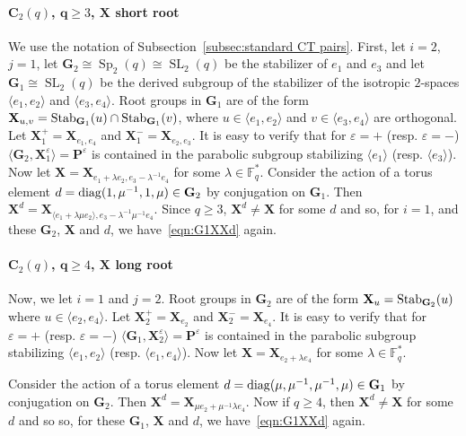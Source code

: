\documentclass[12pt]{amsart}
\theoremstyle{definition}
\newcommand{\diag}{\mathop{\rm diag}\nolimits}
\DeclareMathOperator{\SL}{SL}
\newcommand{\FF}{{\mathbb F}}
\DeclareMathOperator{\Sp}{Sp}
\newcommand{\Stab}{\mathop{\rm Stab}}
\newcommand{\vep}{\varepsilon}
\newcommand{\amgrpG}{{\mathbf{G}}}
\newcommand{\amgrpP}{{\mathbf{P}}}
\newcommand{\amgrpX}{{\mathbf{X}}}
\begin{document}
\paragraph{\bf ${\mathbf C_2(q)}$, ${\mathbf q\ge 3}$, $\mathbf \amgrpX$ short root}
We use  the notation of Subsection~\ref{subsec:standard CT pairs}.
First, let $i=2$, $j=1$, let $\amgrpG_2\cong \Sp_2(q)\cong\SL_2(q)$ be the stabilizer of $e_1$ and $e_3$ and let $\amgrpG_1\cong\SL_2(q)$ be the derived subgroup of the stabilizer of the isotropic $2$-spaces $\langle e_1,e_2\rangle$ and $\langle e_3,e_4\rangle$.
Root groups in $\amgrpG_1$ are of the form
 $\amgrpX_{u,v}=\Stab_{\amgrpG_1}(u)\cap \Stab_{\amgrpG_1}(v)$, where 
  $u\in \langle e_1,e_2\rangle$ and $v\in\langle e_3,e_4\rangle$ are orthogonal.
Let $\amgrpX_1^+=\amgrpX_{e_1,e_4}$ and $\amgrpX_1^-=\amgrpX_{e_2,e_3}$.
It is easy to verify that for $\vep=+$ (resp. $\vep=-$) $\langle \amgrpG_2,\amgrpX_1^\vep\rangle=\amgrpP^\vep$  is contained in the parabolic subgroup stabilizing $\langle e_1\rangle $ (resp. $\langle e_3\rangle$).
Now let $\amgrpX=\amgrpX_{e_1+\lambda e_2, e_3-\lambda^{-1} e_4}$ for some $\lambda\in\FF_q^*$.
Consider the action of a torus element $d=\diag(1, \mu^{-1}, 1, \mu)\in \amgrpG_2$
by conjugation on $\amgrpG_1$. 
Then $\amgrpX^d=\amgrpX_{\langle e_1+ \lambda\mu e_2\rangle,e_3-\lambda^{-1}\mu^{-1} e_4}$.
 Since $q\ge 3$, $\amgrpX^d\ne \amgrpX$ for some $d$ and so, for $i=1$, and these $\amgrpG_2$, $\amgrpX$ and $d$, we have~\eqref{eqn:G1XXd} again.
 

\paragraph{\bf ${\mathbf C_2(q)}$, ${\mathbf q\ge 4}$, $\mathbf \amgrpX$ long root}
Now, we let $i=1$ and $j=2$.
Root groups in $\amgrpG_2$ are of the form $\amgrpX_u=\Stab_{\amgrpG_2}(u)$ where $u\in \langle e_2,e_4\rangle$.
Let $\amgrpX_2^+=\amgrpX_{e_2}$  and $\amgrpX_2^-=\amgrpX_{e_4}$.
It is easy to verify that for $\vep=+$ (resp. $\vep=-$) $\langle \amgrpG_1,\amgrpX_2^\vep\rangle=\amgrpP^\vep$  is contained in the parabolic subgroup stabilizing $\langle e_1,e_2\rangle $ 
(resp. $\langle e_1,e_4\rangle$).
Now let $\amgrpX=\amgrpX_{e_2+\lambda e_4}$ for some $\lambda\in\FF_q^*$.

Consider the action of a torus element $d=\diag(\mu, \mu^{-1}, \mu^{-1}, \mu)\in \amgrpG_1$
by conjugation on $\amgrpG_2$. 
Then $\amgrpX^d=\amgrpX_{\mu e_2+ \mu^{-1}\lambda e_4}$.
Now if $q\ge 4$, then $\amgrpX^d\ne \amgrpX$ for some $d$ and so  so, for these $\amgrpG_1$, $\amgrpX$ and $d$, we have~\eqref{eqn:G1XXd} again.
\end{document}
